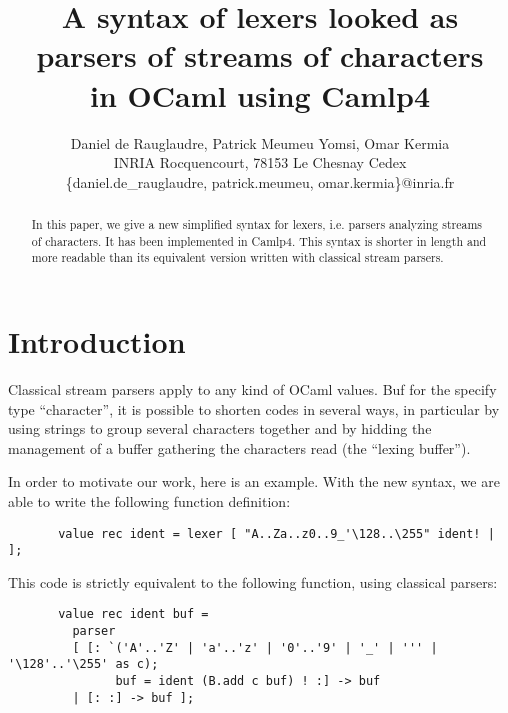 \documentclass[11pt]{article}
\begin{document}
\title{A syntax of lexers looked as parsers of streams of characters\\
  in OCaml using Camlp4}

\date{}
\author{Daniel de Rauglaudre, Patrick Meumeu Yomsi, Omar Kermia\\
INRIA Rocquencourt,
78153 Le Chesnay Cedex \\
\{daniel.de\_rauglaudre, patrick.meumeu, omar.kermia\}@inria.fr}

\thispagestyle{empty}

\maketitle

\begin{abstract}
In this paper, we give a new simplified syntax for lexers,
i.e. parsers analyzing streams of characters. It has been implemented
in Camlp4. This syntax is shorter in length and more readable than its
equivalent version written with classical stream parsers.
\end{abstract}

\section{Introduction}

Classical stream parsers apply to any kind of OCaml values. Buf for
the specify type ``character'', it is possible to shorten codes in
several ways, in particular by using strings to group several
characters together and by hidding the management of a buffer
gathering the characters read (the ``lexing buffer'').

In order to motivate our work, here is an example. With the new syntax,
we are able to write the following function definition:

\begin{verbatim}
       value rec ident = lexer [ "A..Za..z0..9_'\128..\255" ident! | ];
\end{verbatim}

This code is strictly equivalent to the following function, using classical
parsers:

\begin{verbatim}
       value rec ident buf =
         parser
         [ [: `('A'..'Z' | 'a'..'z' | '0'..'9' | '_' | ''' | '\128'..'\255' as c);
               buf = ident (B.add c buf) ! :] -> buf
         | [: :] -> buf ];
\end{verbatim}
\end{document}
